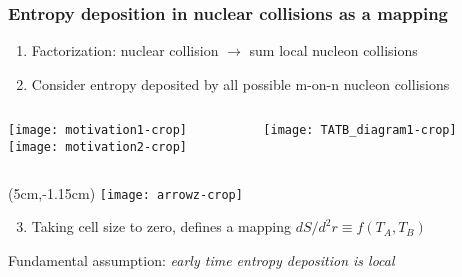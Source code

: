 \documentclass[svgnames]{beamer}
\begin{document}
\begin{frame}
  \frametitle{Entropy deposition in nuclear collisions as a mapping}
  
  \begin{enumerate}
   \item Factorization: nuclear collision $\rightarrow$ sum local nucleon collisions
   \item Consider entropy deposited by all possible m-on-n nucleon collisions
  \end{enumerate}
  
  \vspace{0.1 in}
  
  \begin{columns}
   \begin{column}{0.5\textwidth}
    \centering
    \texttt{[image: motivation1-crop]} \\
    \texttt{[image: motivation2-crop]}
   \end{column}
   \begin{column}{0.5\textwidth}
     \flushleft
     \vspace{0.05 in}
     \texttt{[image: TATB\_diagram1-crop]}
   \end{column}
  \end{columns}
  
  \begin{textblock*}{2cm}(5cm,-1.15cm)
    \texttt{[image: arrowz-crop]}
  \end{textblock*}
  
  \vspace{0.1 in}
  
  \begin{enumerate}
  \setcounter{enumi}{2}
   \item Taking cell size to zero, defines a mapping $dS/d^2r \equiv f(T_A,T_B)$
  \end{enumerate}
  \centering
  Fundamental assumption: \emph{early time entropy deposition is local}
\end{frame}
\end{document}
